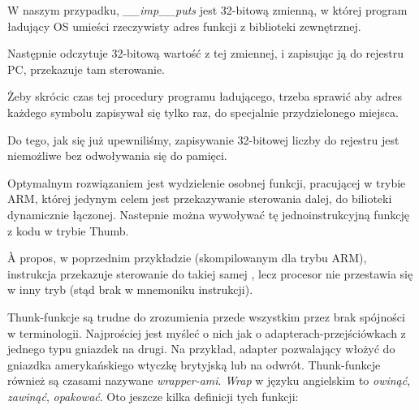 W naszym przypadku, \emph{\_\_imp\_\_puts} jest 32-bitową zmienną, w której program ładujący \ac{OS} umieści rzeczywisty adres funkcji z biblioteki zewnętrznej.

Następnie  odczytuje 32-bitową wartość z tej zmiennej, i zapisując ją do rejestru \ac{PC}, przekazuje tam sterowanie.

Żeby skrócic czas tej procedury programu ładującego, trzeba sprawić aby adres każdego symbolu zapisywał się tylko raz, do specjalnie przydzielonego miejsca.

Do tego, jak się już upewniliśmy, zapisywanie 32-bitowej liczby do rejestru jest niemożliwe bez odwoływania się do pamięci.

Optymalnym rozwiązaniem jest wydzielenie osobnej funkcji, pracującej w trybie ARM,
której jedynym celem jest przekazywanie sterowania dalej, do bilioteki dynamicznie łączonej. Nastepnie można wywoływać tę jednoinstrukcyjną funkcję z kodu w trybie Thumb.

À propos, w poprzednim przykładzie (skompilowanym dla trybu ARM), instrukcja  przekazuje sterowanie do takiej samej , lecz procesor nie przestawia się w inny tryb (stąd brak  w mnemoniku instrukcji).


Thunk-funkcje są trudne do zrozumienia przede wszystkim przez brak spójności w terminologii.
Najprościej jest myśleć o nich jak o adapterach-przejściówkach z jednego typu gniazdek na drugi.
Na przykład, adapter pozwalający włożyć do gniazdka amerykańskiego wtyczkę brytyjską lub na odwrót. Thunk-funkcje również są czasami nazywane \emph{wrapper-ami}. \emph{Wrap} w języku angielskim to \emph{owinąć}, \emph{zawinąć}, \emph{opakować}.
Oto jeszcze kilka definicji tych funkcji:

